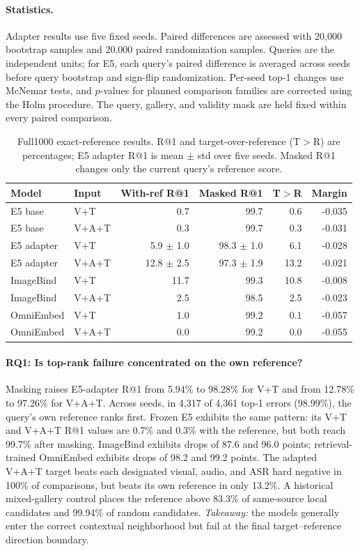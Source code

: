 \documentclass[letterpaper]{article}
\begin{document}
\paragraph{Statistics.}
Adapter results use five fixed seeds.
Paired differences are assessed with 20,000 bootstrap samples and 20,000 paired randomization samples.
Queries are the independent units; for E5, each query's paired difference is averaged across seeds before query bootstrap and sign-flip randomization.
Per-seed top-1 changes use McNemar tests, and $p$-values for planned comparison families are corrected using the Holm procedure.
The query, gallery, and validity mask are held fixed within every paired comparison.

\begin{table}[t]
\centering
\small
\setlength{\tabcolsep}{5.0pt}
\caption{Full1000 exact-reference results. R@1 and target-over-reference (T$>$R) are percentages; E5 adapter R@1 is mean $\pm$ std over five seeds. Masked R@1 changes only the current query's reference score.}
\label{tab:main-results}
\begin{tabular}{llrrrr}
\toprule
Model & Input & With-ref R@1 & Masked R@1 & T$>$R & Margin \\
\midrule
E5 base & V+T & 0.7 & 99.7 & 0.6 & -0.035 \\
E5 base & V+A+T & 0.3 & 99.7 & 0.3 & -0.031 \\
E5 adapter & V+T & 5.9 $\pm$ 1.0 & 98.3 $\pm$ 1.0 & 6.1 & -0.028 \\
E5 adapter & V+A+T & 12.8 $\pm$ 2.5 & 97.3 $\pm$ 1.9 & 13.2 & -0.021 \\
ImageBind & V+T & 11.7 & 99.3 & 10.8 & -0.008 \\
ImageBind & V+A+T & 2.5 & 98.5 & 2.5 & -0.023 \\
OmniEmbed & V+T & 1.0 & 99.2 & 0.1 & -0.057 \\
OmniEmbed & V+A+T & 0.0 & 99.2 & 0.0 & -0.055 \\
\bottomrule
\end{tabular}
\end{table}

\paragraph{RQ1: Is top-rank failure concentrated on the own reference?}
Masking raises E5-adapter R@1 from 5.94\% to 98.28\% for V+T and from 12.78\% to 97.26\% for V+A+T. Across seeds, in 4,317 of 4,361 top-1 errors (98.99\%), the query's own reference ranks first. Frozen E5 exhibits the same pattern: its V+T and V+A+T R@1 values are 0.7\% and 0.3\% with the reference, but both reach 99.7\% after masking. ImageBind exhibits drops of 87.6 and 96.0 points; retrieval-trained OmniEmbed exhibits drops of 98.2 and 99.2 points. The adapted V+A+T target beats each designated visual, audio, and ASR hard negative in 100\% of comparisons, but beats its own reference in only 13.2\%. A historical mixed-gallery control places the reference above 83.3\% of same-source local candidates and 99.94\% of random candidates. \textit{Takeaway:} the models generally enter the correct contextual neighborhood but fail at the final target--reference direction boundary.
\end{document}
